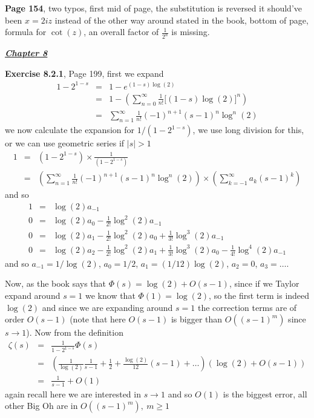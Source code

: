 \documentclass[aps,preprint,preprintnumbers,nofootinbib,showpacs,prd]{revtex4-1}
\newcommand{\nbea}{\begin{eqnarray*}}
\newcommand{\neea}{\end{eqnarray*}}
\begin{document}
{\bf Page 154}, two typos, first mid of page, the substitution is reversed it should've been $x = 2iz$ instead of the other way around stated in the book, bottom of page, formula for $\cot(z)$, an overall factor of $\frac{1}{2^n}$ is missing.

\bigskip
\underline{\textit{\textbf{Chapter 8}}}
\bigskip

{\bf Exercise 8.2.1}, Page 199, first we expand
%
\nbea
1 - 2^{1-s} & = & 1 - e^{(1-s)\log(2)} \\
& = & 1 - \left ( \sum_{n=0}^\infty \frac{1}{n!} \lbrack(1-s)\log(2)\rbrack^n \right ) \\
& = & \sum_{n=1}^\infty \frac{1}{n!} (-1)^{n+1} (s-1)^n \log^n(2)
\neea
%
we now calculate the expansion for $1/(1 - 2^{1-s})$, we use long division for this, or we can use geometric series if $|s| > 1$
%
\nbea
1 & = & (1 - 2^{1-s})\times\frac{1}{(1 - 2^{1-s})} \\
& = & \left(\sum_{n=1}^\infty \frac{1}{n!} (-1)^{n+1} (s-1)^n \log^n(2)\right)\times\left(\sum_{k=-1}^\infty a_k(s-1)^k\right)
\neea
%
and so
%
\nbea
1 & = & \log(2) a_{-1} \\
0 & = & \log(2) a_0 - \frac{1}{2!}\log^2(2) a_{-1} \\
0 & = & \log(2) a_1 - \frac{1}{2!}\log^2(2) a_{0} + \frac{1}{3!}\log^3(2) a_{-1} \\
0 & = & \log(2) a_2 - \frac{1}{2!}\log^2(2) a_{1} + \frac{1}{3!}\log^3(2) a_{0} - \frac{1}{4!}\log^4(2) a_{-1}
\neea
%
and so $a_{-1} = 1/\log(2)$, $a_0 = 1/2$, $a_1 = (1/12)\log(2)$, $a_2 = 0$, $a_3 = \ldots$.

Now, as the book says that $\Phi(s) = \log(2) + O(s-1)$, since if we Taylor expand around $s=1$ we know that $\Phi(1) = \log(2)$, so the first term is indeed $\log(2)$ and since we are expanding around $s=1$ the correction terms are of order $O(s-1)$ (note that here $O(s-1)$ is bigger than $O((s-1)^m)$ since $s\to1$). Now from the definition
%
\nbea
\zeta(s) & = & \frac{1}{1-2^{1-s}} \Phi(s) \\
& = & \left( \frac{1}{\log(2)}\frac{1}{s-1} + \frac{1}{2} + \frac{\log(2)}{12}(s-1) + \ldots \right)\left( \log(2) + O(s-1)\right) \\
& = & \frac{1}{s-1} + O(1)
\neea
%
again recall here we are interested in $s\to1$ and so $O(1)$ is the biggest error, all other Big Oh are in $O((s-1)^m),~m \ge 1$
\end{document}
